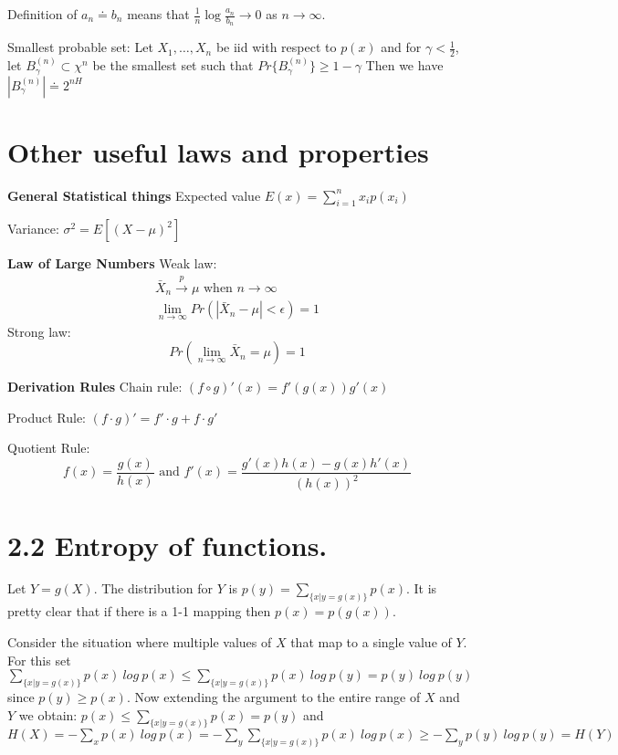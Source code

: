 \documentclass[10pt]{article}
\begin{document}
\begin{tiny}
\begin{multicols}{3}
Definition of $a_n \doteq b_n$ means that $\frac{1}{n}\log \frac{a_n}{b_n} \rightarrow 0$ as $n\rightarrow \infty$.

Smallest probable set: Let $X_1,\ldots, X_n$ be iid with respect to $p(x)$ and for $\gamma < \frac{1}{2}$, let $B_\gamma^{(n)} \subset \chi^n$ be the smallest set such that $Pr\{ B_\gamma^{(n)} \} \geq 1-\gamma $ Then we have $|B_\gamma^{(n)}| \doteq 2^{nH}$

\section*{Other useful laws and properties}
{\bf General Statistical things} Expected value $E(x)=\sum_{i=1}^n x_i p(x_i)$

Variance: $\sigma^2 = E\left[ \left(X-\mu\right)^2\right]$

{\bf Law of Large Numbers} Weak law:
\begin{eqnarray*}
\bar{X}_n\overset{p}\rightarrow \mu \text{ when } n \rightarrow \infty\\
\lim_{n\rightarrow \infty} Pr\left(|\bar{X}_n-\mu| < \epsilon \right) = 1
\end{eqnarray*}
Strong law:
\begin{equation}
Pr\left(\lim_{n\rightarrow \infty} \bar{X}_n = \mu \right) = 1
\end{equation}

{\bf Derivation Rules} Chain rule: $(f \circ g)'(x)=f'(g(x))g'(x)$

Product Rule: $(f\cdot g)' = f' \cdot g + f \cdot g'$

Quotient Rule: \[f(x)=\frac{g(x)}{h(x)}\text{ and }f'(x)=\frac{g'(x)h(x)-g(x)h'(x)}{\left(h(x)\right)^2}\]


\section* {2.2 Entropy of functions.}
Let $Y=g(X)$. The distribution for $Y$ is  $p(y)=\sum_{\{x|y=g(x)\}}p(x)$.  It is pretty clear that if there is a 1-1 mapping then $p(x)=p(g(x))$. 
                          
Consider the situation where multiple values of $X$ that map to a single value of $Y$.
For this set $\sum_{\{x|y=g(x)\}}p(x)\ log\ p(x) \leq \sum_{\{x|y=g(x)\}}p(x)\ log\ p(y) = p(y)\ log\ p(y)$ since $p(y)\geq p(x)$. Now extending the argument to the entire range of $X$ and $Y$ we obtain:
\(
p(x)\leq \sum_{\{x|y=g(x)\}}p(x)=p(y)\) and \(
H(X)=-\sum_{x}p(x)\ log\ p(x)
=-\sum_{y}\sum_{\{x|y=g(x)\}}p(x)\ log\ p(x)
\geq -\sum_{y}p(y)\ log\ p(y)
=H(Y)
\)


\end{multicols}
\end{tiny}
\end{document}
